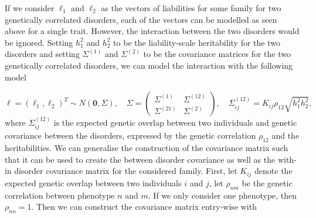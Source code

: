 If we consider $ \ell_1 $ and $ \ell_2 $ as the vectors of liabilities for some family for two genetically correlated disorders, each of the vectors can be modelled as seen above for a single trait. However, the interaction between the two disorders would be ignored. Setting $ h_1^2 $ and $ h_2^2 $ to be the liability-scale heritability for the two disorders and setting $ \Sigma^{(1)} $ and $ \Sigma^{(2)} $ to be the covariance matrices for the two genetically correlated disorders, we can model the interaction with the following model

\begin{equation*}
	\ell = \left(\ell_1, \ell_2\right)^T \sim N(\mathbf{0}, \Sigma), \quad \Sigma = 
	\begin{pmatrix} 
		\Sigma^{(1)} & \Sigma^{(12)} \\
		\Sigma^{(21)} & \Sigma^{(2)} 
	\end{pmatrix}, \quad \Sigma^{(12)}_{ij} = K_{ij}\rho_{12}\sqrt{h_1^2 h_2^2},
\end{equation*}
where $ \Sigma_{ij}^{(12)} $ is the expected genetic overlap between two individuals and genetic covariance between the disorders, expressed by the genetic correlation $ \rho_{12} $ and the heritabilities. We can generalise the construction of the covariance matrix such that it can be used to create the between disorder covariance as well as the with-in disorder covariance matrix for the considered family. First, let $ K_{ij} $ denote the expected genetic overlap between two individuals $ i $ and $ j $, let $ \rho_{nm} $ be the genetic correlation between phenotype $ n $ and $ m $. If we only consider one phenotype, then $ \rho_{nn} = 1$. Then we can construct the covariance matrix entry-wise with 

